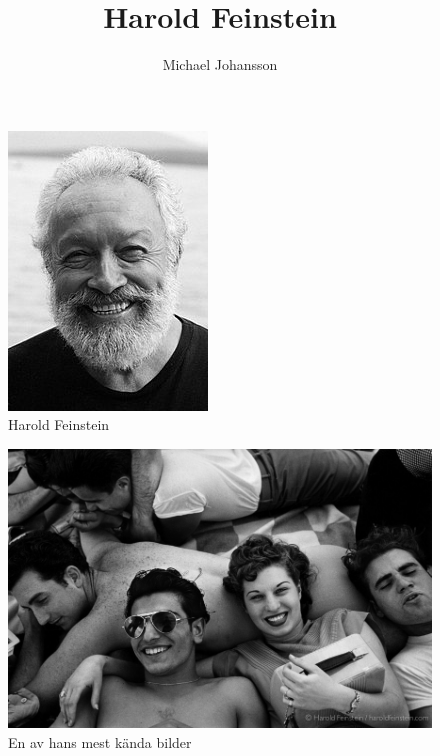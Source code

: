 \documentclass{article}
\author{Michael Johansson}
\title{Harold Feinstein}
\begin{document}
\maketitle

\begin{figure}
  \includegraphics[width=\linewidth]{feinstein.jpg}
  \caption{Harold Feinstein}
\end{figure}

\begin{figure}
	\includegraphics[width=\linewidth]{kandbild.jpg}
	\caption{En av hans mest kända bilder}
\end{figure}
\end{document}

